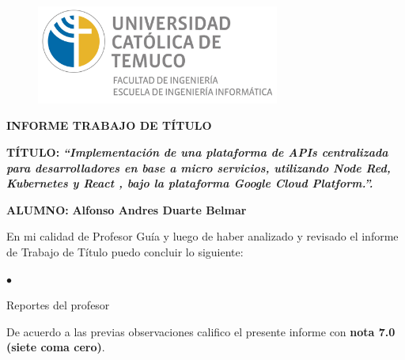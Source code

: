 
\thispagestyle{empty}
\begin{titlepage}

{
\begin{center}
\vspace*{-1in}
\begin{figure}[htb]
\begin{center}
\includegraphics[width=8cm]{./figuras/logo_informatica.jpg}
\end{center}
\end{figure}

\vspace*{0.2in}
\textbf{ \normalsize{INFORME TRABAJO DE TÍTULO}} \\
\vspace*{0.2in}
\begin{flushleft}
\textbf{ \normalsize{TÍTULO:}} \hspace*{0.2in} \textbf{ \textit{ \normalsize{``Implementación de una plataforma de APIs centralizada para desarrolladores en base a micro servicios, utilizando Node Red, Kubernetes y React , bajo la plataforma Google Cloud Platform.''.}}}
\end{flushleft}
\vspace*{0.1in}
\begin{flushleft}
\textbf{ \normalsize{ALUMNO:}} \hspace*{0.2in} \textbf{ \normalsize{Alfonso Andres Duarte Belmar}}
\end{flushleft}
\vspace*{0.3in}

\begin{flushleft}

\hspace{1cm} En mi calidad de Profesor Guía y luego de haber analizado y revisado el informe de Trabajo de Título puedo concluir lo siguiente:

\begin{list}{$\bullet$}{}
  \item Reportes del profesor
\end{list}

\hspace{1cm} De acuerdo a las previas observaciones califico el presente informe con \textbf {nota 7.0 (siete coma cero)}.
\end{flushleft}


\end{center}}
\end{titlepage}
